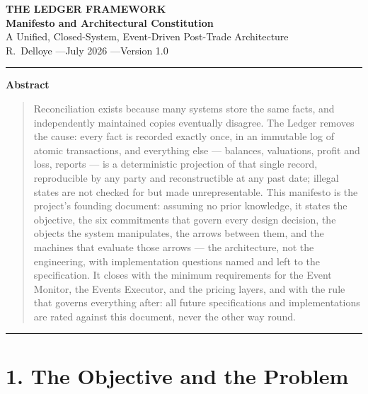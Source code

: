 \documentclass[11pt,a4paper]{article}
\begin{document}
\begin{center}
  {\LARGE\bfseries THE LEDGER FRAMEWORK}\\[0.9em]
  {\large\bfseries Manifesto and Architectural Constitution}\\[0.6em]
  {\normalsize A Unified, Closed-System, Event-Driven Post-Trade Architecture}\\[1.4em]
  R.~Delloye \quad---\quad July 2026 \quad---\quad Version 1.0
\end{center}

\vspace{0.6em}
\begin{center}\rule{0.35\linewidth}{0.4pt}\end{center}
\vspace{0.6em}

\begin{center}\textbf{Abstract}\end{center}
\begin{quote}
Reconciliation exists because many systems store the same facts, and
independently maintained copies eventually disagree. The Ledger removes
the cause: every fact is recorded exactly once, in an immutable log of
atomic transactions, and everything else --- balances, valuations,
profit and loss, reports --- is a deterministic projection of that
single record, reproducible by any party and reconstructible at any past
date; illegal states are not checked for but made unrepresentable. This
manifesto is the project's founding document: assuming no prior
knowledge, it states the objective, the six commitments that govern
every design decision, the objects the system manipulates, the arrows
between them, and the machines that evaluate those arrows --- the
architecture, not the engineering, with implementation questions named
and left to the specification. It closes with the minimum requirements
for the Event Monitor, the Events Executor, and the pricing layers, and
with the rule that governs everything after: all future specifications
and implementations are rated against this document, never the other way
round.
\end{quote}

\vspace{0.6em}
\begin{center}\rule{0.35\linewidth}{0.4pt}\end{center}
\vspace{0.6em}

\hypertarget{the-objective-and-the-problem}{%
\section{1. The Objective and the
Problem}\label{the-objective-and-the-problem}}
\end{document}

